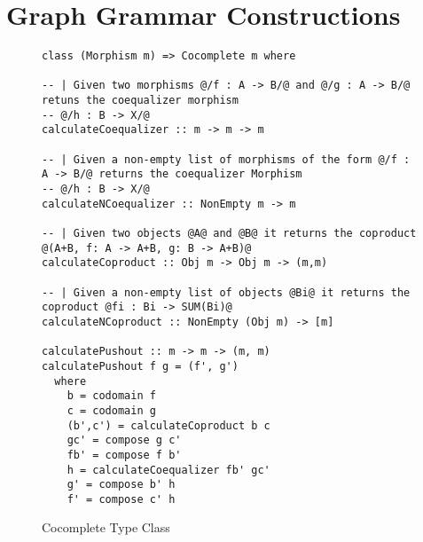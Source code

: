\section{Graph Grammar Constructions}
\begin{figure}[!ht]
\begin{verbatim}
class (Morphism m) => Cocomplete m where

-- | Given two morphisms @/f : A -> B/@ and @/g : A -> B/@ retuns the coequalizer morphism
-- @/h : B -> X/@
calculateCoequalizer :: m -> m -> m

-- | Given a non-empty list of morphisms of the form @/f : A -> B/@ returns the coequalizer Morphism
-- @/h : B -> X/@
calculateNCoequalizer :: NonEmpty m -> m

-- | Given two objects @A@ and @B@ it returns the coproduct @(A+B, f: A -> A+B, g: B -> A+B)@
calculateCoproduct :: Obj m -> Obj m -> (m,m)

-- | Given a non-empty list of objects @Bi@ it returns the coproduct @fi : Bi -> SUM(Bi)@
calculateNCoproduct :: NonEmpty (Obj m) -> [m]

calculatePushout :: m -> m -> (m, m)
calculatePushout f g = (f', g')
  where
    b = codomain f
    c = codomain g
    (b',c') = calculateCoproduct b c
    gc' = compose g c'
    fb' = compose f b'
    h = calculateCoequalizer fb' gc'
    g' = compose b' h
    f' = compose c' h
\end{verbatim}
\caption{Cocomplete Type Class}
\end{figure}
